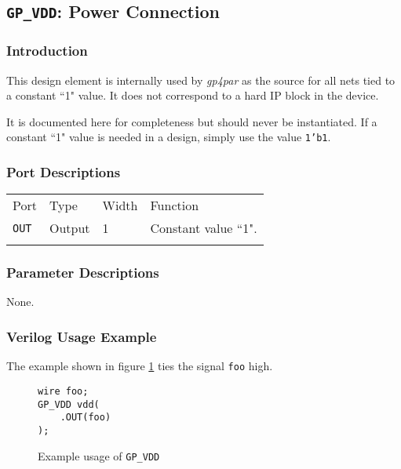 \documentclass[11pt]{article}
\newcommand{\namestyle}[1]{\textit{#1}}
\newcommand{\tokenstyle}[1]{\texttt{#1}}
\newcommand{\wirestyle}[1]{\texttt{#1}}
\newcommand{\datastyle}[1]{\texttt{#1}}
\newcommand{\whenstyle}[1]{{\fontseries{sb}\selectfont#1}}
\newcommand{\thinhline}{\Xhline{1\arrayrulewidth}}
\newcommand{\thickhline}{\Xhline{2.5\arrayrulewidth}}
\begin{document}

\FloatBarrier
\pagebreak
\subsection{\tokenstyle{GP\_VDD}: Power Connection}

\subsubsection{Introduction}
This design element is internally used by \namestyle{gp4par} as the source for all nets tied to a constant ``1" value. It does not correspond to a hard IP block in the device.

It is documented here for completeness but should never be instantiated. If a constant ``1" value is needed in a
design, simply use the value \datastyle{1'b1}.

\subsubsection{Port Descriptions}

\begin{tabularx}{\textwidth}{lllX}
\thinhline
\whenstyle{Port} & \whenstyle{Type} & \whenstyle{Width} & \whenstyle{Function} \\
\thickhline
\tokenstyle{OUT} & Output & 1 & Constant value ``1". \\
\thinhline
\end{tabularx}

\subsubsection{Parameter Descriptions}

None.

\subsubsection{Verilog Usage Example}

The example shown in figure \ref{gp-vdd-example} ties the signal \wirestyle{foo} high.

\begin{figure}[h]
\begin{lstlisting}
wire foo;
GP_VDD vdd(
	.OUT(foo)
);
\end{lstlisting}
\caption{Example usage of \tokenstyle{GP\_VDD}}
\label{gp-vdd-example}
\end{figure}
\end{document}
